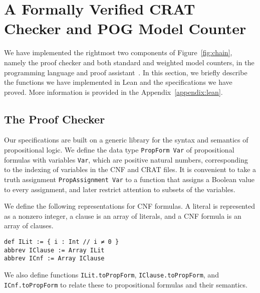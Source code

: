 \section{A Formally Verified CRAT Checker and POG Model Counter}

We have implemented the rightmost two components of Figure~\ref{fig:chain}, namely the
proof checker and both standard and weighted model counters, in the \lean{} programming language
and proof assistant~\cite{demoura:cade:2021}.
In this section, we briefly describe the functions we have implemented in Lean and
the specifications we have proved.
More information is provided in the Appendix~\ref{appendix:lean}.

\subsection{The Proof Checker}
\label{subsection:proof:checker}

Our specifications are built on a generic library for the syntax and semantics of
propositional logic. We define the data type \lstinline{PropForm Var} of propositional
formulas with variables \lstinline{Var}, which are positive natural numbers,
corresponding to the indexing of variables in the CNF and CRAT files.
It is convenient to take a truth assignment \lstinline{PropAssignment Var} to a function that
assigns a Boolean value to every assignment, and later restrict attention to subsets of the
variables.

We define the following representations for CNF formulas.
A literal is represented as a nonzero integer, a clause is an array of literals,
and a CNF formula is an array of clauses.
\begin{lstlisting}
def ILit := { i : Int // i ≠ 0 }
abbrev IClause := Array ILit
abbrev ICnf := Array IClause
\end{lstlisting}
We also define functions \lstinline{ILit.toPropForm}, \lstinline{IClause.toPropForm},
and \lstinline{ICnf.toPropForm} to relate these to propositional formulas and their
semantics.


